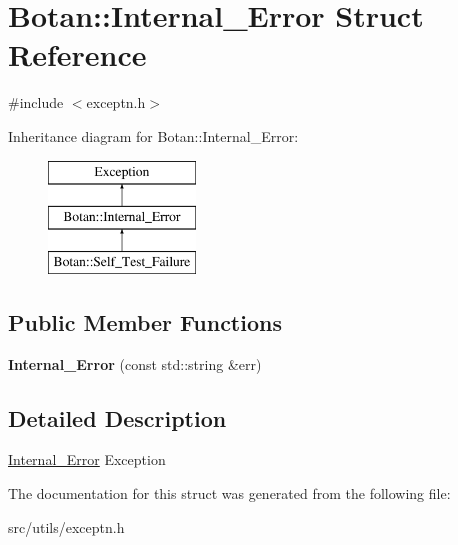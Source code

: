 \hypertarget{structBotan_1_1Internal__Error}{\section{Botan\-:\-:Internal\-\_\-\-Error Struct Reference}
\label{structBotan_1_1Internal__Error}
}


{\ttfamily \#include $<$exceptn.\-h$>$}

Inheritance diagram for Botan\-:\-:Internal\-\_\-\-Error\-:\begin{figure}[H]
\begin{center}
\leavevmode
\includegraphics[height=3.000000cm]{structBotan_1_1Internal__Error}
\end{center}
\end{figure}
\subsection*{Public Member Functions}
\begin{DoxyCompactItemize}
\item 
\hypertarget{structBotan_1_1Internal__Error_a3a8dc6cd0d334de0cd3a9a1909c53778}{{\bfseries Internal\-\_\-\-Error} (const std\-::string \&err)}\label{structBotan_1_1Internal__Error_a3a8dc6cd0d334de0cd3a9a1909c53778}

\end{DoxyCompactItemize}


\subsection{Detailed Description}
\hyperlink{structBotan_1_1Internal__Error}{Internal\-\_\-\-Error} Exception 

The documentation for this struct was generated from the following file\-:\begin{DoxyCompactItemize}
\item 
src/utils/exceptn.\-h\end{DoxyCompactItemize}
